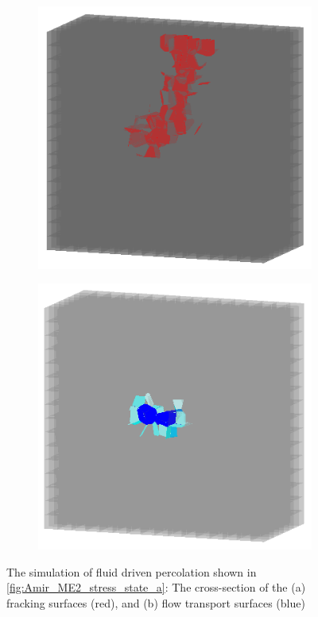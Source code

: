 \begin{figure}[!ht]
\begin{subfigure}[c]{0.48\textwidth}
\includegraphics[width=1\textwidth]{figures/Amir_ME2_LEM_a_model_Fracture.png}
\subcaption{}
\label{fig:Amir_ME2_LEM_a_model_Fracture}
\end{subfigure}
\hfill
\begin{subfigure}[c]{0.48\textwidth}
\includegraphics[width=1\textwidth]{figures/Amir_ME2_LEM_a_model_Flow.png}
\subcaption{}
\label{fig:Amir_ME2_LEM_a_model_Flow}
\end{subfigure}
\caption{ The simulation of fluid driven percolation shown in \ref{fig:Amir_ME2_stress_state_a}: The cross-section of the (a) fracking surfaces (red), and (b) flow transport surfaces (blue)}
\end{figure}

